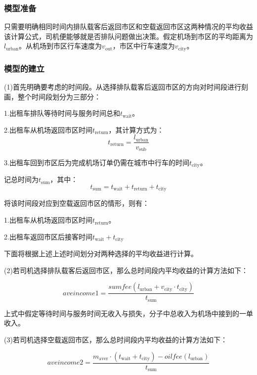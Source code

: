 \documentclass[withoutpreface,bwprint]{cumcmthesis} %
\begin{document}
\subsubsection{模型准备}

只需要明确相同时间内排队载客后返回市区和空载返回市区这两种情况的平均收益该计算公式，司机便能够就是否排队问题做出决策。假定机场到市区的平均距离为$l_{\mathrm{urban}}$。从机场到市区行车速度为$v_{\mathrm{out}}$，市区中行车速度为$v_{\mathrm{city}}$。
\par
\newpage
\subsubsection{模型的建立}

(1)首先明确要考虑的时间段。从选择排队载客后返回市区的方向对时间段进行刻画，整个时间段划分为三部分：

1.出租车排队等待时间与服务时间总和$t_{ \mathrm{wait}}$。

2.出租车从机场返回市区时间$t_{ \mathrm{return}}$，其计算方式为：
\begin{equation}
	t_{ \mathrm{return}}=\frac{l_{\mathrm{urban}}}{v_{\mathrm{sub}}}
\end{equation}

3.出租车回到市区后为完成机场订单仍需在城市中行车的时间$t_{\mathrm{city}}$。

记总时间为$t_{ \mathrm{sum}}$，其中：
\begin{equation}
	t_{ \mathrm{sum}}=t_{ \mathrm{wait}}+t_{ \mathrm{return}}+t_{\mathrm{city}}
\end{equation}

将该时间段对应到空载返回市区的情形，则有：

1.出租车从机场返回市区时间$t_{ \mathrm{return}}$。

2.出租车返回市区后接客时间$t_{ \mathrm{wait}}+t_{\mathrm{city}}$

下面将根据上述上述时间划分对两种选择的平均收益进行计算。

(2)若司机选择排队载客后返回市区，那么总时间段内平均收益的计算方法如下：\par
\begin{equation}
	aveincome1=\frac{sumfee(l_{\mathrm{urban}}+v_{\mathrm{city}} \cdot t_{\mathrm{city}})}{t_{ \mathrm{sum}}}
\end{equation}
\par
上式中假定等待时间与服务时间无收入与损失，分子中总收入为机场中接到的一单收入。

\par \par
(3)若司机选择空载返回市区，那么总时间段内平均收益的计算方法如下：\par
\begin{equation}
	aveincome2=\frac{m_{\mathrm{aver}}\cdot(t_{\mathrm{wait}}+t_{\mathrm{city}})-oilfee(l_{\mathrm{urban}})}{t_{ \mathrm{sum}}}
\end{equation}
\end{document}
